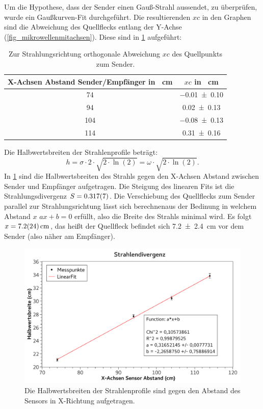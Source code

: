\documentclass[
	a4paper,
	12pt,
	pagesize,
	ngerman
]{scrartcl}
\begin{document}
	Um die Hypothese, dass der Sender einen Gauß-Strahl aussendet, zu überprüfen, wurde ein Gaußkurven-Fit durchgeführt. 
	Die resultierenden $xc$ in den Graphen sind die Abweichung des Quellflecks entlang der Y-Achse (\cref{fig_mikrowellenmitachsen}). 
	Diese sind in \cref{tab_xc} aufgeführt:
	\begin{table}[H]
		\centering
		\begin{tabular}{ c | c }
			X-Achsen Abstand Sender/Empfänger in \SI{}{cm} & $xc$ in \SI{}{cm}  \\ \hline
			\SI{74}{}&\SI{-0,01+-0,10}{}\\
			\SI{94}{}&\SI{0,02+-0,13}{}\\
			\SI{104}{}&\SI{-0,08+-0,13}{}\\
			\SI{114}{}&\SI{0,31+-0,16}{}\\
		\end{tabular}
		\caption{Zur Strahlungsrichtung orthogonale Abweichung $xc$ des Quellpunkts zum Sender.}
		\label{tab_xc} 
	\end{table}

	Die Halbwertsbreiten der Strahlenprofile beträgt: 
	\begin{equation}
		h = \sigma \cdot 2 \cdot \sqrt{2\cdot\ln(2)} = \omega \cdot \sqrt{2\cdot\ln(2)}.
	\end{equation}
	In \cref{fig_divergenz} sind die Halbwertsbreiten des Strahls gegen den X-Achsen Abstand zwischen Sender und Empfänger aufgetragen.
	Die Steigung des linearen Fits ist die Strahlungsdivergenz $S = \SI{0,317+-0,007}{}$.
	Die Verschiebung des Quellflecks zum Sender parallel zur Strahlungsrichtung lässt sich berechnenaus der Bedinung in welchem Abstand $x$ $ax+b=0$ erfüllt, also die Breite des Strahls minimal wird.
	Es folgt $x=\SI{7,2+-2,4}{cm}$, das heißt der Quellfleck befindet sich \SI{7,2+-2,4}{cm} vor dem Sender (also näher am Empfänger).

	\begin{figure}[H]
		\includegraphics[width=1\textwidth]{fig_divergenz}
		\centering
		\caption{Die Halbwertsbreiten der Strahlenprofile sind gegen den Abstand des Sensors in X-Richtung aufgetragen.}
		\label{fig_divergenz}
		\centering
	\end{figure}
	
\end{document}
